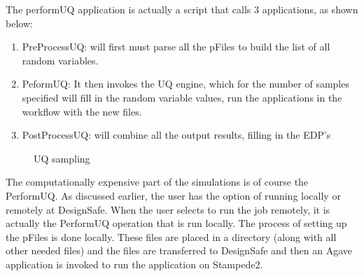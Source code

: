 The performUQ application is actually a script that calls 3 applications, as shown below:
\begin{enumerate}
\item	 PreProcessUQ: will first must parse all the pFiles to build the list of all random variables.
\item	 PeformUQ: It then invokes the UQ engine, which for the number of samples specified will fill in the random variable values, run the applications in the workflow with the new files.
\item	 PostProcessUQ: will combine all the output results, filling in the EDP’s
\end{enumerate}


\begin{figure}[!htbp]
  \caption{UQ sampling}
  \label{fig:figure19}
\end{figure}

The computationally expensive part of the simulations is of course the PerformUQ. As discussed earlier, the user has the option of running locally or 
remotely at DesignSafe. When the user selects to run the job remotely, it is actually the PerformUQ operation that is run locally. The process of setting 
up the pFiles is done locally. These files are placed in a directory (along with all other needed files) and the files are transferred to DesignSafe and then an 
Agave application is invoked to run the application on Stampede2.

